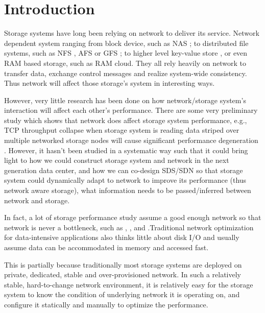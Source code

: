 \section{Introduction}
\label{section:intro}

Storage systems have long been relying on network to deliver its service. Network dependent system ranging from block device, such as NAS \cite{nas}; to distributed file systems, such as NFS \cite{nfs}, AFS \cite{afs} or GFS \cite{gfs}; to higher level key-value store \cite{dynamo}, or even RAM based storage, such as RAM cloud. They all rely heavily on network to transfer data, exchange control messages and realize system-wide consistency. Thus network will affect those storage's system in interesting ways.

However, very little research has been done on how network/storage system's interaction will affect each other's performance. There are some very preliminary study which shows that network does affect storage system performance, e.g., TCP throughput collapse when storage system is reading data striped over multiple networked storage nodes will cause significant performance degeneration \cite{incast}.
 However, it hasn't been studied in a systematic way such that it could bring light to how we could construct storage system and network in the next generation data center, and how we can co-design SDS/SDN so that storage system could dynamically adapt to network to improve its performance (thus network aware storage), what information needs to be passed/inferred between network and storage. 


In fact, a lot of storage performance study assume a good enough network so that network is never a bottleneck, such as \cite{schedule-storage-system}, \cite{pisces}, and \cite{flat-datacenter-storage}.Traditional network optimization for data-intensive applications also thinks little about disk I/O and usually assume data can be accommodated in memory and accessed fast.

This is partially because traditionally most storage systems are deployed on private, dedicated, stable and over-provisioned network.
 In such a relatively stable, hard-to-change network environment, it is relatively easy for the storage system to know the condition of underlying network it is operating on, and configure it statically and manually to optimize the performance.

